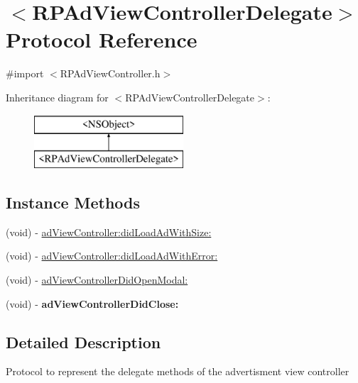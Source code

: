 \hypertarget{protocol_r_p_ad_view_controller_delegate-p}{\section{$<$R\-P\-Ad\-View\-Controller\-Delegate$>$ Protocol Reference}
\label{protocol_r_p_ad_view_controller_delegate-p}
}


{\ttfamily \#import $<$R\-P\-Ad\-View\-Controller.\-h$>$}

Inheritance diagram for $<$R\-P\-Ad\-View\-Controller\-Delegate$>$\-:\begin{figure}[H]
\begin{center}
\leavevmode
\includegraphics[height=2.000000cm]{protocol_r_p_ad_view_controller_delegate-p}
\end{center}
\end{figure}
\subsection*{Instance Methods}
\begin{DoxyCompactItemize}
\item 
(void) -\/ \hyperlink{protocol_r_p_ad_view_controller_delegate-p_a43b07adeca1121744c5484827cc21fe0}{ad\-View\-Controller\-:did\-Load\-Ad\-With\-Size\-:}
\item 
(void) -\/ \hyperlink{protocol_r_p_ad_view_controller_delegate-p_ab90957392890bd23625d116bf75df024}{ad\-View\-Controller\-:did\-Load\-Ad\-With\-Error\-:}
\item 
(void) -\/ \hyperlink{protocol_r_p_ad_view_controller_delegate-p_a23d62cc5e1011534263c78a6ad0bf93e}{ad\-View\-Controller\-Did\-Open\-Modal\-:}
\item 
\hypertarget{protocol_r_p_ad_view_controller_delegate-p_aa4621fdd81d2341e33ec1e5befa02d67}{(void) -\/ {\bfseries ad\-View\-Controller\-Did\-Close\-:}}\label{protocol_r_p_ad_view_controller_delegate-p_aa4621fdd81d2341e33ec1e5befa02d67}

\end{DoxyCompactItemize}


\subsection{Detailed Description}
Protocol to represent the delegate methods of the advertisment view controller 

